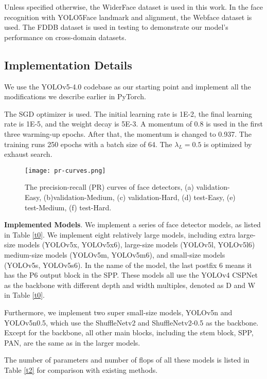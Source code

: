 \documentclass[conference]{IEEEtran}
\begin{document}
Unless specified otherwise, the WiderFace dataset \cite{WiderFace} is used in this work. In the face recognition with YOLO5Face landmark and alignment, the Webface dataset \cite{webface} is used. The FDDB dataset \cite{fddb} is used in testing to demonstrate our model's performance on cross-domain datasets.   

\subsection{Implementation Details}

We use the YOLOv5-4.0 codebase \cite{YOLOv5} as our starting point and implement all the modifications we describe earlier in PyTorch.  

The SGD optimizer is used. The initial learning rate is 1E-2, the final learning rate is 1E-5, and the weight decay is 5E-3. A momentum of 0.8 is used in the first three warming-up epochs. After that, the momentum is changed to 0.937. The training runs 250 epochs with a batch size of 64. The ${\lambda_L=0.5}$ is optimized by exhaust search.     

\begin{figure*}
    \centering
    \texttt{[image: pr-curves.png]}
    \caption{The precision-recall (PR) curves of face detectors, (a) validation-Easy, (b)validation-Medium, (c) validation-Hard, (d) test-Easy, (e) test-Medium, (f) test-Hard. }
    \label{pr}
\end{figure*}

\textbf{Implemented Models}. We implement a series of face detector models, as listed in Table \ref{t0}. We implement eight relatively large models, including extra large-size models (YOLOv5x, YOLOv5x6), large-size models (YOLOv5l, YOLOv5l6) medium-size models (YOLOv5m, YOLOv5m6), and small-size models (YOLOv5s, YOLOv5s6). In the name of the model, the last postfix 6 means it has the P6 output block in the SPP. These models all use the YOLOv4 CSPNet as the backbone with different depth and width multiples, denoted as D and W in Table \ref{t0}. 

Furthermore, we implement two super small-size models, YOLOv5n and YOLOv5n0.5, which use the ShuffleNetv2 and ShuffleNetv2-0.5 \cite{ShuffleNetv2} as the backbone. Except for the backbone, all other main blocks, including the stem block, SPP, PAN, are the same as in the larger models. 

The number of parameters and number of flops of all these models is listed in Table \ref{t2} for comparison with existing methods. 
\end{document}
